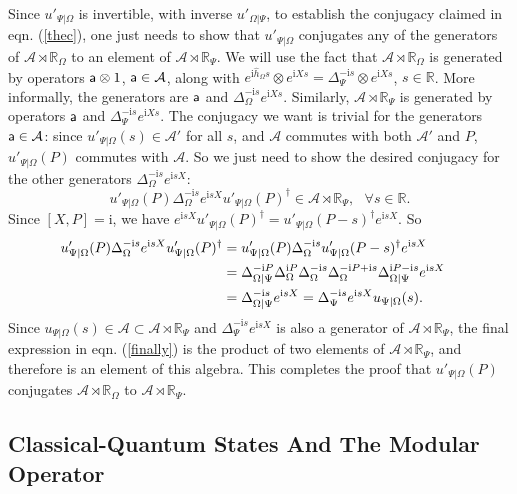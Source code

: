 \documentclass[11pt,a4paper]{article}
\def\a{{\sf a}}
\def\i{{\mathrm i}}
\def\be{\begin{equation}}
\def\ee{\end{equation}}
\def\h{\widehat}
\def\A{{\mathcal A}}
\def\R{{\mathbb R}}
\def\h{\widehat}
\begin{document}
Since $u'_{\Psi|\Omega}$ is invertible, with inverse $u'_{\Omega|\Psi}$, to establish the conjugacy claimed in eqn. (\ref{thec}), one just needs
to show that $u'_{\Psi|\Omega}$ conjugates any of the generators of $\A\rtimes \R_\Omega$ to an element of $\A\rtimes\R_\Psi$.
We will use the fact that $\A\rtimes\R_\Omega$ is generated by operators $\a\otimes 1$, $\a\in \A$, along with $e^{\i \h h_\Omega s}\otimes e^{\i X s}=\Delta_\Psi^{-\i s}
\otimes e^{\i  Xs }$, $s\in \R$.
More informally, the generators are $\a$ and $\Delta_\Omega^{-\i s}e^{\i Xs}$.     Similarly,  $\A\rtimes \R_\Psi$ is generated by operators 
$\a$ and $\Delta_\Psi^{-\i s}e^{\i X s}$.    The conjugacy we want is trivial for the generators $\a\in \A$: since $u'_{\Psi|\Omega}(s)\in \A'$ for all $s$, and $\A$
commutes with both $\A'$ and $P$, $u'_{\Psi|\Omega}(P)$ commutes with $\A$.
   So we just need to show the desired conjugacy for the other generators $\Delta_\Omega^{-\i s}e^{\i sX}$:
\be\label{doffo} u'_{\Psi|\Omega}(P) \Delta_\Omega^{-\i s}e^{\i s X}u'_{\Psi|\Omega}(P)^\dagger\in \A\rtimes \R_\Psi,~~~\forall s\in\R.\ee
Since $[X,P]=\i$, we have $e^{\i s X}u'_{\Psi|\Omega}(P)^\dagger= u'_{\Psi|\Omega}(P-s)^\dagger e^{\i s X}$.
So
\begin{align}\label{finally} u'_{\Psi|\Omega}(P) \Delta_\Omega^{-\i s}e^{\i s X}u'_{\Psi|\Omega}(P)^\dagger &=u'_{\Psi|\Omega}(P) \Delta_\Omega^{-\i s}u'_{\Psi|\Omega}(P-s)^\dagger e^{\i s X} \cr & = \Delta_{\Omega|\Psi}^{-\i P} \Delta_\Omega^{\i P} \Delta_\Omega^{-\i s} \Delta_\Omega^{-\i P+\i s}\Delta_{\Omega|\Psi}
^{\i P-\i s} e^{\i s X} \cr &=\Delta_{\Omega|\Psi}^{-\i s}e^{\i s X} = \Delta_\Psi^{-\i s} e^{\i s X} u_{\Psi|\Omega}(s)  .  \end{align}
Since  $ u_{\Psi|\Omega}(s)\in \A\subset \A\rtimes \R_\Psi$ and $\Delta_\Psi^{-\i s} e^{\i s X}$ is also a generator of $\A\rtimes \R_\Psi$,
the final expression in eqn. (\ref{finally}) is the product of two elements of $\A\rtimes \R_\Psi$, and therefore is an element of this algebra.   
This completes the proof that $u'_{\Psi|\Omega}(P)$ conjugates $\A\rtimes \R_\Omega$ to $\A\rtimes \R_\Psi$.

\subsection{Classical-Quantum States And The Modular Operator}\label{cqm}
\end{document}
